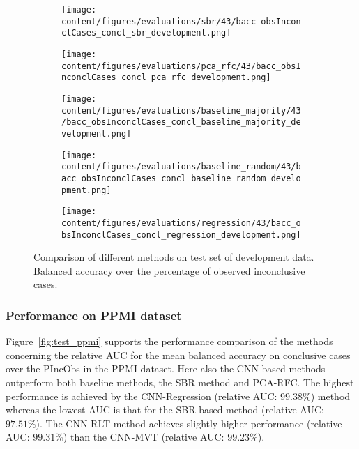\begin{figure}[ht]
  \begin{subfigure}{0.5\textwidth}
    \centering
    \texttt{[image: content/figures/evaluations/sbr/43/bacc\_obsInconclCases\_concl\_sbr\_development.png]}
  \end{subfigure}
  \hfill
  \begin{subfigure}{0.5\textwidth}
    \centering
    \texttt{[image: content/figures/evaluations/pca\_rfc/43/bacc\_obsInconclCases\_concl\_pca\_rfc\_development.png]}
  \end{subfigure}
  \hfill
  \begin{subfigure}{0.5\textwidth}
    \centering
    \texttt{[image: content/figures/evaluations/baseline\_majority/43/bacc\_obsInconclCases\_concl\_baseline\_majority\_development.png]}
  \end{subfigure}
  \hfill
  \begin{subfigure}{0.5\textwidth}
    \centering
    \texttt{[image: content/figures/evaluations/baseline\_random/43/bacc\_obsInconclCases\_concl\_baseline\_random\_development.png]}
  \end{subfigure}
  \hfill
  \begin{subfigure}{0.5\textwidth}
    \centering
    \texttt{[image: content/figures/evaluations/regression/43/bacc\_obsInconclCases\_concl\_regression\_development.png]}
  \end{subfigure}

  \caption{Comparison of different methods on test set of development data. 
  Balanced accuracy over the percentage of observed inconclusive cases.}
  \label{fig:test_dev}
\end{figure}



\subsubsection{Performance on PPMI dataset}


Figure~\ref{fig:test_ppmi} supports the performance comparison of the methods 
concerning the relative AUC for the mean balanced accuracy on conclusive cases over the PIncObs 
in the PPMI dataset.
Here also the CNN-based methods outperform both baseline methods, the SBR method and PCA-RFC.
The highest performance is achieved by the CNN-Regression (relative AUC: $99.38\%$) method 
whereas the lowest AUC is that for the SBR-based method (relative AUC: $97.51\%$).
The CNN-RLT method achieves slightly higher performance (relative AUC: $99.31\%$) than the CNN-MVT (relative AUC: $99.23\%$).



